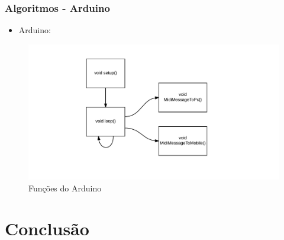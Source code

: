 \documentclass[hyperref={pdfpagelabels=false}]{beamer}
\begin{document}
            \begin{frame}\frametitle{Algoritmos - Arduino}

                    \begin{itemize}
                        \item Arduino:
                    \end{itemize}

                    \begin{figure}[H]
                        \centering
                        \includegraphics[scale=0.6]{Imagens/diagrama-arduino.jpeg}
                        \caption[Funções do Arduino]{Funções do Arduino}
                    \end{figure}

            \end{frame}

        \section{Conclusão}
\end{document}
